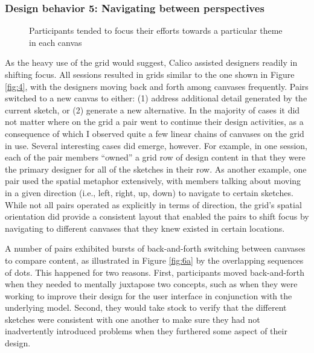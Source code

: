 \documentclass[12pt,fleqn]{ucithesis}
\begin{document}
\subsubsection {Design behavior 5: Navigating between perspectives}
\label{results:21}

\begin{figure}%
  \centering
   \caption {Participants tended to focus their efforts towards a particular theme in each canvas}
   \label{fig:7}
\end{figure}%

As the heavy use of the grid would suggest, Calico assisted designers readily in shifting focus. All sessions resulted in grids similar to the one shown in Figure \ref{fig:4}, with the designers moving back and forth among canvases frequently. Pairs switched to a new canvas to either: (1) address additional detail generated by the current sketch, or (2) generate a new alternative. In the majority of cases it did not matter where on the grid a pair went to continue their design activities, as a consequence of which I observed quite a few linear chains of canvases on the grid in use. Several interesting cases did emerge, however. For example, in one session, each of the pair members ``owned'' a grid row of design content in that they were the primary designer for all of the sketches in their row. As another example, one pair used the spatial metaphor extensively, with members talking about moving in a given direction (i.e., left, right, up, down) to navigate to certain sketches. While not all pairs operated as explicitly in terms of direction, the grid's spatial orientation did provide a consistent layout that enabled the pairs to shift focus by navigating to different canvases that they knew existed in certain locations.   

A number of pairs exhibited bursts of back-and-forth switching between canvases to compare content, as illustrated in Figure \ref{fig:6a} by the overlapping sequences of dots. This happened for two reasons. First, participants moved back-and-forth when they needed to mentally juxtapose two concepts, such as when they were working to improve their design for the user interface in conjunction with the underlying model. Second, they would take stock to verify that the different sketches were consistent with one another to make sure they had not inadvertently introduced problems when they furthered some aspect of their design.
\end{document}
